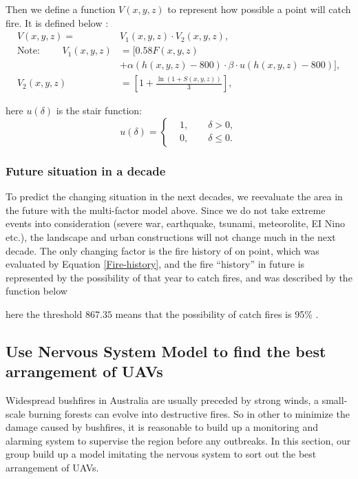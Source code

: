 \documentclass[13pt]{ctexart} %
\begin{document}
Then we define a function $V(x,y,z)$ to represent how possible a point will catch fire. It is defined below :
\begin{equation}\label{PossibilityFire}
    \begin{aligned}
        V(x,y,z) =& V_1(x,y,z)\cdot V_2(x,y,z), \\
        \text{Note: }\qquad V_1(x,y,z) &= [
            0.58 F(x,y,z)\\
           & +\alpha\left(
                h(x,y,z)-800
                 \right)\cdot
                 \beta\cdot u(h(x,y,z)-800)
            ], \\
        V_2(x,y,z) &=\left[
            1+\frac{\ln \left(1+S\left(x,y,z\right)\right)}{3}
            \right],
    \end{aligned}
\end{equation}

here $u(\delta)$ is the stair function:
\begin{equation}\label{Stair}%
    u(\delta)=
    \left\{
    \begin{aligned}
         & 1,\qquad \delta> 0,\\
         & 0,\qquad \delta\leq 0.
    \end{aligned}
    \right.
\end{equation}

\subsubsection{Future situation in a decade}
To predict the changing situation in the next decades, we reevaluate the area in the future with the multi-factor model above. Since we do not take extreme events into consideration (severe war, earthquake, tsunami, meteorolite, EI Nino etc.), the landscape and urban constructions will not change much in the next decade. The only changing factor is the fire history of on point, which was evaluated by Equation \ref{Fire-history}, and the fire “history” in future is represented by the possibility of that year to catch fires, and was described by the function below


here the threshold $867.35$ means that the possibility of catch fires is 95\% .


\subsection{Use Nervous System Model to find the best arrangement of UAVs}
Widespread bushfires in Australia are usually preceded by strong winds, a small-scale burning forests can evolve into destructive fires. So in other to minimize the damage caused by bushfires, it is reasonable to build up a monitoring and alarming system to supervise the region before any outbreaks. In this section, our group build up a model imitating the nervous system to sort out the best arrangement of UAVs.
\end{document}
